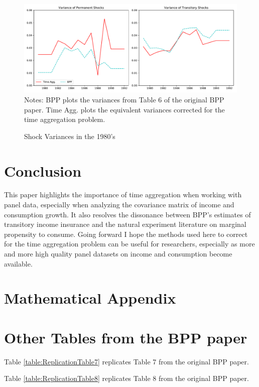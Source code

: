 \documentclass[AER]{AEA}
\begin{document}


\begin{figure}
	\includegraphics[width=1\textwidth]{../Code/Figures/ShockVariances1980s.pdf}
	\footnotesize Notes: BPP plots the variances from Table 6 of the original BPP paper. Time Agg. plots the equivalent variances corrected for the time aggregation problem.
	\caption{Shock Variances in the 1980's}
	\label{figure:shockVariance}
\end{figure}

\section{Conclusion}
This paper highlights the importance of time aggregation when working with panel data, especially when analyzing the covariance matrix of income and consumption growth. It also resolves the dissonance between BPP's estimates of transitory income insurance and the natural experiment literature on marginal propensity to consume. Going forward I hope the methods used here to correct for the time aggregation problem can be useful for researchers, especially as more and more high quality panel datasets on income and consumption become available.




\appendix

\section{Mathematical Appendix}






\section{Other Tables from the BPP paper} \label{table_appendix}
Table \ref{table:ReplicationTable7} replicates Table 7 from the original BPP paper.

 

Table \ref{table:ReplicationTable8} replicates Table 8 from the original BPP paper.
\end{document}
